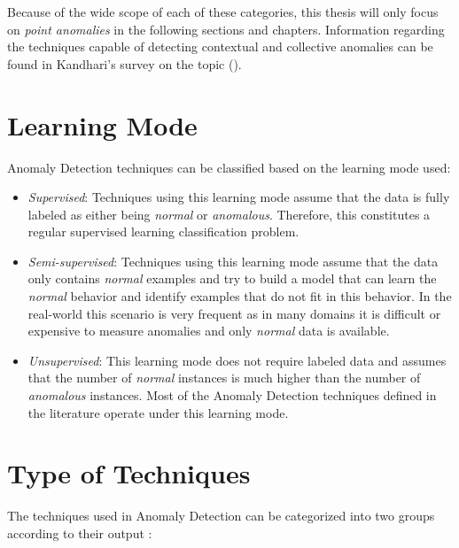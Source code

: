 Because of the wide scope of each of these categories, this thesis will only focus on \textit{point anomalies} in the following sections and chapters. Information regarding the techniques capable of detecting contextual and collective anomalies can be found in Kandhari's survey on the topic (\cite{Kandhari2009}).

\section{Learning Mode} \label{sec:anomly_learn}

Anomaly Detection techniques can be classified based on the learning mode used:

\begin{itemize}
	\item \textit{Supervised}: Techniques using this learning mode assume that the data is fully labeled as either being \textit{normal} or \textit{anomalous}.
	Therefore, this constitutes a regular supervised learning classification problem. %
	
	\item \textit{Semi-supervised}: Techniques using this learning mode assume that the data only contains \textit{normal} examples and try to build a model that can learn the \textit{normal} behavior and identify examples that do not fit in this behavior.
	In the real-world this scenario is very frequent as in many domains it is difficult or expensive to measure anomalies and only \textit{normal} data is available.
	
	\item \textit{Unsupervised}: This learning mode does not require labeled data and assumes that the number of \textit{normal} instances is much higher than the number of \textit{anomalous} instances.
	Most of the Anomaly Detection techniques defined in the literature operate under this learning mode.
\end{itemize}


\section{Type of Techniques} \label{sec:anomaly_appr}

The techniques used in Anomaly Detection can be categorized into two groups according to their output \cite{Kandhari2009}:

